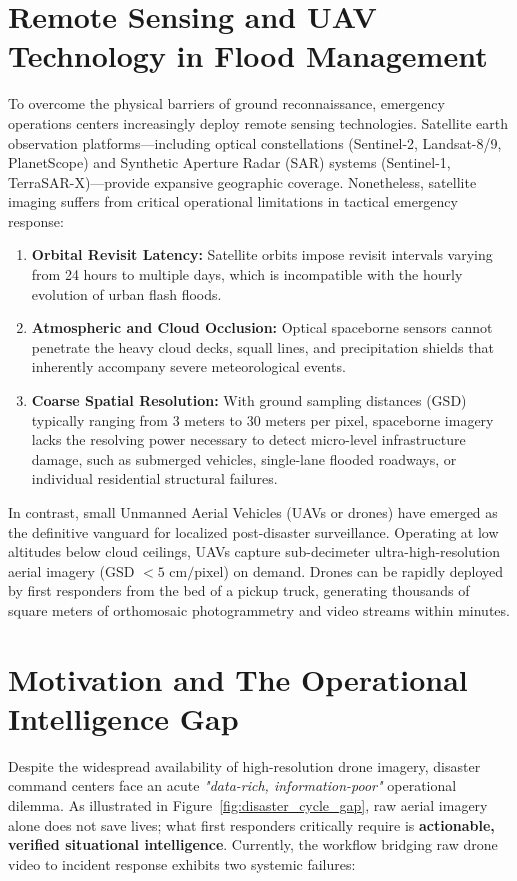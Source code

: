 \section{Remote Sensing and UAV Technology in Flood Management}
To overcome the physical barriers of ground reconnaissance, emergency operations centers increasingly deploy remote sensing technologies. Satellite earth observation platforms—including optical constellations (Sentinel-2, Landsat-8/9, PlanetScope) and Synthetic Aperture Radar (SAR) systems (Sentinel-1, TerraSAR-X)—provide expansive geographic coverage. Nonetheless, satellite imaging suffers from critical operational limitations in tactical emergency response:
\begin{enumerate}
    \item \textbf{Orbital Revisit Latency:} Satellite orbits impose revisit intervals varying from 24 hours to multiple days, which is incompatible with the hourly evolution of urban flash floods.
    \item \textbf{Atmospheric and Cloud Occlusion:} Optical spaceborne sensors cannot penetrate the heavy cloud decks, squall lines, and precipitation shields that inherently accompany severe meteorological events.
    \item \textbf{Coarse Spatial Resolution:} With ground sampling distances (GSD) typically ranging from 3 meters to 30 meters per pixel, spaceborne imagery lacks the resolving power necessary to detect micro-level infrastructure damage, such as submerged vehicles, single-lane flooded roadways, or individual residential structural failures.
\end{enumerate}

In contrast, small Unmanned Aerial Vehicles (UAVs or drones) have emerged as the definitive vanguard for localized post-disaster surveillance. Operating at low altitudes below cloud ceilings, UAVs capture sub-decimeter ultra-high-resolution aerial imagery (GSD $< 5\text{ cm/pixel}$) on demand. Drones can be rapidly deployed by first responders from the bed of a pickup truck, generating thousands of square meters of orthomosaic photogrammetry and video streams within minutes.

\section{Motivation and The Operational Intelligence Gap}
Despite the widespread availability of high-resolution drone imagery, disaster command centers face an acute \textit{"data-rich, information-poor"} operational dilemma. As illustrated in Figure~\ref{fig:disaster_cycle_gap}, raw aerial imagery alone does not save lives; what first responders critically require is \textbf{actionable, verified situational intelligence}. Currently, the workflow bridging raw drone video to incident response exhibits two systemic failures:

